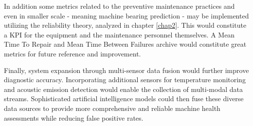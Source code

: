 {In addition some metrics related to the preventive maintenance practices and even in smaller scale - meaning machine bearing prediction - may be implemented utilizing the reliability theory, analyzed in chapter \ref{chap2}. This would constitute a KPI for the equipment and the maintenance personnel themselves. A Mean Time To Repair and Mean Time Between Failures archive would constitute great metrics for future reference and improvement.

Finally, system expansion through multi-sensor data fusion would further improve diagnostic accuracy. Incorporating additional sensors for temperature monitoring and acoustic emission detection would enable the collection of multi-modal data streams. Sophisticated artificial intelligence models could then fuse these diverse data sources to provide more comprehensive and reliable machine health assessments while reducing false positive rates.
}
